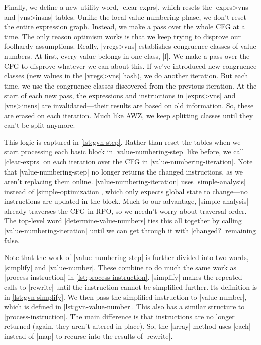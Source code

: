 Finally, we define a new utility word, \factor|clear-exprs|, which resets the
\factor|exprs>vns| and \factor|vns>insns| tables.  Unlike the local value
numbering phase, we don't reset the entire expression graph.  Instead, we make
a pass over the whole \gls{CFG} at a time.  The only reason optimism works is
that we keep trying to disprove our foolhardy assumptions.  Really,
\factor|vregs>vns| establishes congruence classes of value numbers.  At first,
every value belongs in one class, \factor|f|.  We make a pass over the
\gls{CFG} to disprove whatever we can about this.  If we've introduced new
congruence classes (new values in the \factor|vregs>vns| hash), we do another
iteration.  But each time, we use the congruence classes discovered from the
previous iteration.  At the start of each new pass, the expressions and
instructions in \factor|exprs>vns| and \factor|vns>insns| are
invalidated---their results are based on old information.  So, these are erased
on each iteration.  Much like AWZ, we keep splitting classes until
they can't be split anymore.


This logic is captured in \vref{lst:gvn-step}.  Rather than reset the tables
when we start processing each basic block in \factor|value-numbering-step| like
before, we call \factor|clear-exprs| on each iteration over the \gls{CFG} in
\factor|value-numbering-iteration|.  Note that \factor|value-numbering-step| no
longer returns the changed instructions, as we aren't replacing them online.
\factor|value-numbering-iteration| uses \factor|simple-analysis| instead of
\factor|simple-optimization|, which only expects global state to change---no
instructions are updated in the block.  Much to our advantage,
\factor|simple-analysis| already traverses the \gls{CFG} in \acrlong{RPO}, so
we needn't worry about traversal order.  The top-level word
\factor|determine-value-numbers| ties this all together by calling
\factor|value-numbering-iteration| until we can get through it with
\factor|changed?| remaining false.


Note that the work of \factor|value-numbering-step| is further divided into two
words, \factor|simplify| and \factor|value-number|.  These combine to do much
the same work as \factor|process-instruction| in
\vref{lst:process-instruction}.  \factor|simplify| makes the repeated calls to
\factor|rewrite| until the instruction cannot be simplified further.  Its
definition is in \vref{lst:gvn-simplify}.  We then pass the simplified
instruction to \factor|value-number|, which is defined in
\vref{lst:gvn-value-number}.  This also has a similar structure to
\factor|process-instruction|.  The main difference is that instructions are no
longer returned (again, they aren't altered in place).  So, the \factor|array|
method uses \factor|each| instead of \factor|map| to recurse into the results
of \factor|rewrite|.

